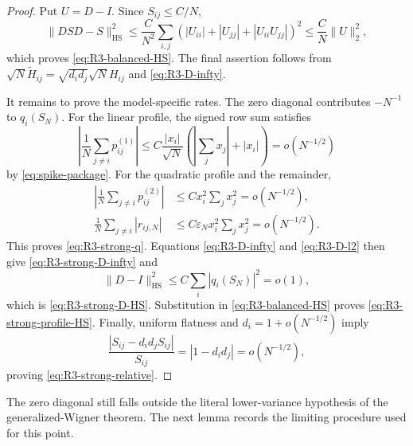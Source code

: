 \documentclass[10pt,a4paper]{amsart}
\newcommand{\HS}{\mathrm{HS}}
\newcommand{\norm}[1]{\lVert #1\rVert}
\begin{document}
\begin{proof}
Put \(U=D-I\).  Since \(S_{ij}\le C/N\),
\[
 \norm{DSD-S}_{\HS}^2
 \le \frac{C}{N^2}\sum_{i,j}
 (|U_{ii}|+|U_{jj}|+|U_{ii}U_{jj}|)^2
 \le \frac{C}{N}\norm U_2^2,
\]
which proves \eqref{eq:R3-balanced-HS}.  The final assertion follows from
\(\sqrt N\widetilde H_{ij}=\sqrt{d_id_j}\sqrt N H_{ij}\) and
\eqref{eq:R3-D-infty}.

It remains to prove the model-specific rates.  The zero diagonal contributes
$-N^{-1}$ to $q_i(S_N)$.  For the linear profile, the signed row sum satisfies
\[
 \left|\frac1N\sum_{j\ne i}p_{ij}^{(1)}\right|
 \leq C\frac{|x_i|}{\sqrt N}
 \left(\left|\sum_jx_j\right|+|x_i|\right)
 =o(N^{-1/2})
\]
by \eqref{eq:spike-package}.  For the quadratic profile and the remainder,
\begin{align*}
 \left|\frac1N\sum_{j\ne i}p_{ij}^{(2)}\right|
 &\leq Cx_i^2\sum_jx_j^2=o(N^{-1/2}),\\
 \frac1N\sum_{j\ne i}|r_{ij,N}|
 &\leq C\varepsilon_Nx_i^2\sum_jx_j^2=o(N^{-1/2}).
\end{align*}
This proves \eqref{eq:R3-strong-q}.  Equations
\eqref{eq:R3-D-infty} and \eqref{eq:R3-D-l2} then give
\eqref{eq:R3-strong-D-infty} and
\[
 \norm{D-I}_{\HS}^2
 \leq C\sum_i|q_i(S_N)|^2=o(1),
\]
which is \eqref{eq:R3-strong-D-HS}.  Substitution in
\eqref{eq:R3-balanced-HS} proves \eqref{eq:R3-strong-profile-HS}.
Finally, uniform flatness and $d_i=1+o(N^{-1/2})$ imply
\[
 \frac{|S_{ij}-d_id_jS_{ij}|}{S_{ij}}
 =|1-d_id_j|=o(N^{-1/2}),
\]
proving \eqref{eq:R3-strong-relative}.
\end{proof}

The zero diagonal still falls outside the literal lower-variance hypothesis
of the generalized-Wigner theorem.  The next lemma records the limiting
procedure used for this point.
\end{document}
